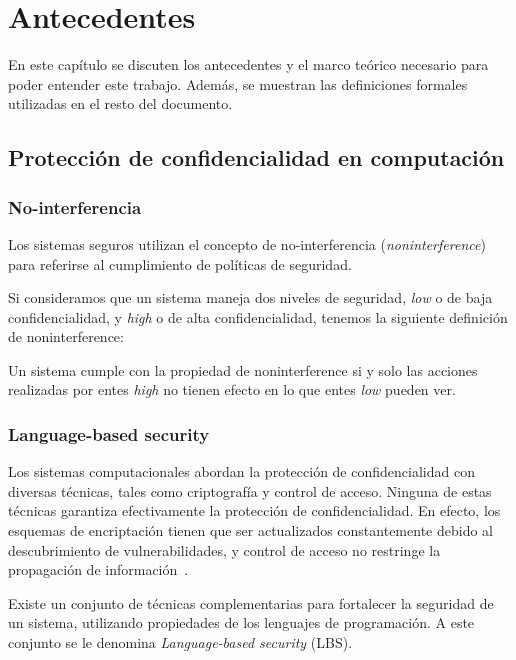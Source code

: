 \chapter{Antecedentes}

En este capítulo se discuten los antecedentes y el marco teórico necesario para poder entender este trabajo. Además, se muestran las definiciones formales utilizadas en el resto del documento.

\section{Protección de confidencialidad en computación}

\subsection{No-interferencia}
Los sistemas seguros utilizan el concepto de no-interferencia (\textit{noninterference})~\cite{noninterference} para referirse al cumplimiento de políticas de seguridad.

Si consideramos que un sistema maneja dos niveles de seguridad, \textit{low} o de baja confidencialidad, y \textit{high} o de alta confidencialidad, tenemos la siguiente definición de noninterference:

\begin{defn}[Noninterference]
  Un sistema cumple con la propiedad de noninterference si y solo las acciones realizadas por entes \textit{high} no tienen efecto en lo que entes \textit{low} pueden ver.
\end{defn}

\subsection{Language-based security}
Los sistemas computacionales abordan la protección de confidencialidad con diversas técnicas, tales como criptografía y control de acceso. Ninguna de estas técnicas garantiza efectivamente la protección de confidencialidad. En efecto, los esquemas de encriptación tienen que ser actualizados constantemente debido al descubrimiento de vulnerabilidades, y control de acceso no restringe la propagación de información~\cite{myers-phd}.

Existe un conjunto de técnicas complementarias para fortalecer la seguridad de un sistema, utilizando propiedades de los lenguajes de programación. A este conjunto se le denomina \textit{Language-based security} (LBS).

